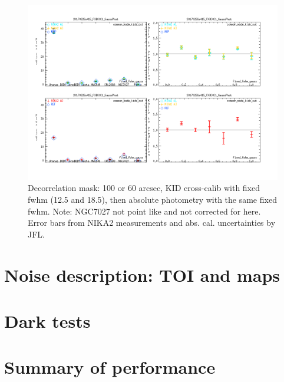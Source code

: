 \documentclass[a4paper, 11pt]{article} %
\begin{document}
\begin{figure}
\begin{center}
\includegraphics[clip, angle=0, scale = 0.4]{Figures/Calibrators_N2R9_20170226s415_FXDC0C1_GaussPhotFluxType_fixed_fwhm_gauss.png}
\caption{Decorrelation mask: 100 or 60 arcsec, KID cross-calib with fixed fwhm
  (12.5 and 18.5), then absolute photometry with the same fixed fwhm. Note:
  NGC7027 not point like and not corrected for here. Error bars from NIKA2
  measurements and abs. cal. uncertainties by JFL.}
\label{fig:fov}
\end{center}
\end{figure}




\section{Noise description: TOI and maps}

\section{Dark tests}

\section{Summary of performance}






\end{document}
